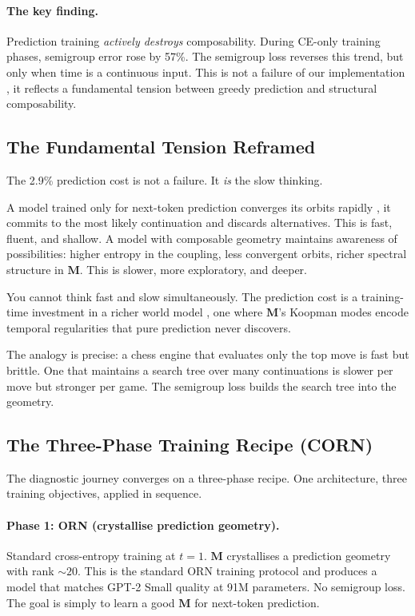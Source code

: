 \documentclass[11pt, a4paper]{article}
\newcommand{\M}{\mathbf{M}}
\theoremstyle{plain}
\theoremstyle{remark}
\begin{document}
\paragraph{The key finding.}
Prediction training \emph{actively destroys} composability.
During CE-only training phases, semigroup error rose by 57\%.
The semigroup loss reverses this trend, but only when time is a continuous input.
This is not a failure of our implementation ,  it reflects a fundamental tension between greedy prediction and structural composability.

\subsection{The Fundamental Tension Reframed}

The 2.9\% prediction cost is not a failure.
It \emph{is} the slow thinking.

A model trained only for next-token prediction converges its orbits rapidly ,  it commits to the most likely continuation and discards alternatives.
This is fast, fluent, and shallow.
A model with composable geometry maintains awareness of possibilities: higher entropy in the coupling, less convergent orbits, richer spectral structure in $\M$.
This is slower, more exploratory, and deeper.

You cannot think fast and slow simultaneously.
The prediction cost is a training-time investment in a richer world model ,  one where $\M$'s Koopman modes encode temporal regularities that pure prediction never discovers.

The analogy is precise: a chess engine that evaluates only the top move is fast but brittle.
One that maintains a search tree over many continuations is slower per move but stronger per game.
The semigroup loss builds the search tree into the geometry.

\subsection{The Three-Phase Training Recipe (CORN)}

The diagnostic journey converges on a three-phase recipe.
One architecture, three training objectives, applied in sequence.

\paragraph{Phase 1: ORN (crystallise prediction geometry).}
Standard cross-entropy training at $t = 1$.
$\M$ crystallises a prediction geometry with rank $\sim 20$.
This is the standard ORN training protocol and produces a model that matches GPT-2 Small quality at 91M parameters.
No semigroup loss.
The goal is simply to learn a good $\M$ for next-token prediction.
\end{document}
